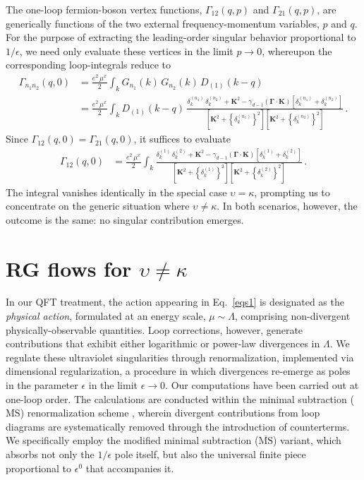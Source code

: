 The one-loop fermion-boson vertex functions, $\Gamma_{12}(q,p)$ and 
$\Gamma_{21}(q,p)$, are generically functions of the two external 
frequency-momentum variables, $p$ and $q$. For the purpose of extracting 
the leading-order singular behavior proportional to $1/\epsilon$, we need only 
evaluate these vertices in the limit $p \rightarrow 0$, whereupon the 
corresponding loop-integrals reduce to
\begin{align}
\Gamma_{n_1 n_2}(q,0) &= \frac{e^2\,\mu^{x}}{2} 
\int_k G_{n_1}(k)\,G_{n_2}(k)\,D_{(1)}(k-q) \nonumber \\
&= \frac{e^2\,\mu^{x}}{2} \int_k D_{(1)}(k-q)\,
\frac{\delta_k^{(n_1)}\,\delta_k^{(n_2)} + \mathbf{K}^2 
- \gamma_{d-1}\left(\boldsymbol{\Gamma}\cdot\mathbf{K}\right)
\left[\delta_k^{(n_1)} + \delta_k^{(n_2)}\right]}
{\left[\mathbf{K}^2 + \left\{\delta_k^{(n_1)}\right\}^2\right]
\left[\mathbf{K}^2 + \left\{\delta_k^{(n_2)}\right\}^2\right]}\,.
\end{align}
Since $\Gamma_{12}(q,0) = \Gamma_{21}(q,0)$, it suffices to evaluate
\begin{align}
\label{eqgamint0}
\Gamma_{12}(q,0) &= \frac{e^2\,\mu^{x}}{2} \int_k
\frac{\delta_k^{(1)}\,\delta_k^{(2)} + \mathbf{K}^2 
- \gamma_{d-1}\left(\boldsymbol{\Gamma}\cdot\mathbf{K}\right)
\left[\delta_k^{(1)} + \delta_k^{(2)}\right]}
{\left[\mathbf{K}^2 + \left\{\delta_k^{(1)}\right\}^2\right]
\left[\mathbf{K}^2 + \left\{\delta_k^{(2)}\right\}^2\right]}\,.
\end{align}
The integral vanishes identically in the special case $\upsilon = \kappa$, 
prompting us to concentrate on the generic situation where 
$\upsilon \neq \kappa$. In both scenarios, however, the outcome is the 
same: no singular contribution emerges.



\section{RG flows for $\upsilon \neq  \kappa $}
\label{secrg}


In our QFT treatment, the action appearing in Eq.~\eqref{eqs1} is 
designated as the \textit{physical action}, formulated at an energy 
scale, $\mu \sim \Lambda$, comprising non-divergent physically-observable 
quantities. Loop corrections, however, generate contributions that 
exhibit either logarithmic or power-law divergences in $\Lambda$. We 
regulate these ultraviolet singularities through renormalization, 
implemented via dimensional regularization, a procedure in which 
divergences re-emerge as poles in the parameter $\epsilon$ in the limit 
$\epsilon \rightarrow 0$. Our computations have been carried out at 
one-loop order. The calculations are conducted within the minimal 
subtraction ($\mathrm{MS}$) renormalization scheme \cite{thooft, weinberg}, 
wherein divergent contributions from loop diagrams are systematically 
removed through the introduction of counterterms. We specifically employ 
the modified minimal subtraction ($\overline{\mathrm{MS}}$) variant, 
which absorbs not only the $1/\epsilon$ pole itself, but also the 
universal finite piece proportional to $\epsilon^0$ that
accompanies it.

